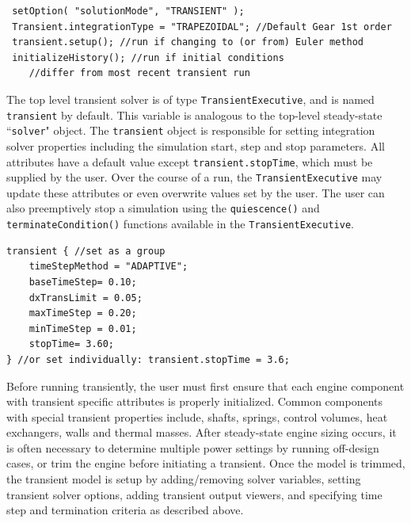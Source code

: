 \documentclass[heading.tex]{subfiles}
\begin{document}
\begin{adjustwidth}{-0.5cm}{-0.5cm}
 \begin{verbatim}
 setOption( "solutionMode", "TRANSIENT" );
 Transient.integrationType = "TRAPEZOIDAL"; //Default Gear 1st order
 transient.setup(); //run if changing to (or from) Euler method
 initializeHistory(); //run if initial conditions 
 	//differ from most recent transient run
 \end{verbatim}
 \end{adjustwidth} 
       

The top level transient solver is of type \texttt{TransientExecutive}, and is named \texttt{transient} by default. This variable is analogous to the top-level steady-state ``\texttt{solver}" object. The \texttt{transient} object is responsible for setting integration solver properties including the simulation start, step and stop parameters. \cite[chap.~7.5]{NPSS} \cite[chap.~15.1.8]{NPSS}  All attributes have a default value except \texttt{transient.stopTime}, which must be supplied by the user. Over the course of a run, the \texttt{TransientExecutive} may update these attributes or even overwrite values set by the user. The user can also preemptively stop a simulation using the  \texttt{quiescence()} and  \texttt{terminateCondition()} functions available in the \texttt{TransientExecutive}.

\begin{adjustwidth}{0cm}{0cm}
 \begin{verbatim}
transient { //set as a group
	timeStepMethod = "ADAPTIVE";
	baseTimeStep= 0.10;
	dxTransLimit = 0.05;
	maxTimeStep = 0.20;
	minTimeStep = 0.01;
	stopTime= 3.60;
} //or set individually: transient.stopTime = 3.6;
 \end{verbatim}
 \end{adjustwidth} 

Before running transiently, the user must first ensure that each engine component with transient specific attributes is properly initialized. Common components with special transient properties include, shafts, springs, control volumes, heat exchangers, walls and thermal masses.
After steady-state engine sizing occurs, it is often necessary to determine multiple power settings by running off-design cases, or trim the engine before initiating a transient. Once the model is trimmed, the transient model is setup by adding/removing solver variables, setting transient solver options, adding transient output viewers, and specifying time step and termination criteria as described above.
\end{document}
